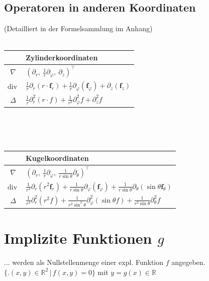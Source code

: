 \documentclass[6pt,a4paper]{scrartcl}
\newcommand{\iset}[2]{\ensuremath{\bigl\{ \bigl. #1 \, \bigr| \, #2 \bigr\}}}                   %
\renewcommand{\vec}[1]{\ensuremath{\boldsymbol {#1}}}                                           %
\renewcommand{\div}{\ensuremath{\mathrm{div}\ }}                               %
\begin{document}
\begin{multicols*}{4}
    \subsection{Operatoren in anderen Koordinaten}
    (Detailliert in der Formelsammlung im Anhang) \\ \\
    \begin{tabular}{c|l}
                  & Zylinderkoordinaten                                                                                             \\ \midrule
        $\nabla$  & $(\partial_r,\ \frac{1}{r}\partial_\varphi,\ \partial_z)^\top$                                                  \\ \midrule
        $\div$    & $\frac{1}{r} \partial_r(r\cdot \vec f_r) + \frac{1}{r} \partial_\varphi(\vec f_\varphi) + \partial_z(\vec f_z)$ \\ \midrule
        $ \Delta$ & $\frac{1}{r} \partial^2_{r}(r\cdot f) + \frac{1}{r^2} \partial^2_{\varphi}f + \partial^2_{z}f$
    \end{tabular}
    \\ \\ \\
    \begin{tabular}{c|l}
                  & Kugelkoordinaten                                                                                                                                                              \\ \midrule

        $\nabla$  & $(\partial_r,\ \frac{1}{r}\partial_\varphi,\ \frac{1}{r\sin\theta}\partial_\theta)^\top$                                                                                      \\ \midrule
        $\div$    & $  \frac{1}{r^{2}}  \partial_r(r^2 \vec f_r) + \frac{1}{r \sin \theta} \partial_\varphi(\vec f_\varphi) + \frac{1}{r \sin \theta} \partial_\theta(\sin \theta \vec f_\theta)$ \\ \midrule
        $\Delta $ & $ \frac{1}{r^{2}} \partial^2_{r}(r^2 f) + \frac{1}{r^2\sin^2\theta} \partial^2_{\varphi} (\sin\theta f) + \frac{1}{r^2\sin\theta} \partial^2_{\theta} f$
    \end{tabular}
    \fi

    \section{Implizite Funktionen $g$}
    ... werden als Nullstellenmenge einer expl. Funktion $f$ angegeben.\\
    $\iset{(x,y) \in \mathbb R^2 }{f(x,y) = 0}$ mit $y=g(x) \in \mathbb R$


\end{multicols*}
\end{document}
